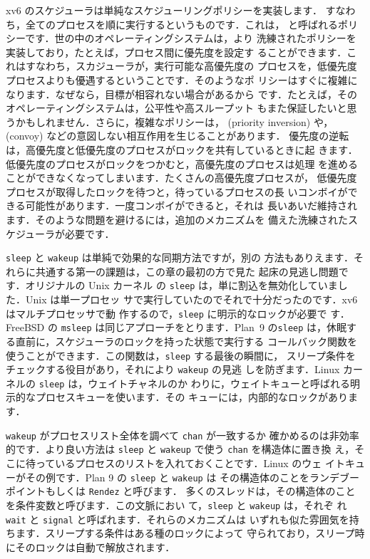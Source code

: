 xv6 のスケジューラは単純なスケジューリングポリシーを実装します．
すなわち，全てのプロセスを順に実行するというものです．これは，
と呼ばれるポリシーです．世の中のオペレーティングシステムは，より
洗練されたポリシーを実装しており，たとえば，プロセス間に優先度を設定す
ることができます．これはすなわち，スカジューラが，実行可能な高優先度の
プロセスを，低優先度プロセスよりも優遇するということです．そのようなポ
リシーはすぐに複雑になります．なぜなら，目標が相容れない場合があるから
です．たとえば，そのオペレーティングシステムは，公平性や高スループット
もまた保証したいと思うかもしれません．さらに，複雑なポリシーは，
 (priority inversion) や， (convoy) などの意図しない相互作用を生じることがあります．
優先度の逆転は，高優先度と低優先度のプロセスがロックを共有しているときに起
きます．低優先度のプロセスがロックをつかむと，高優先度のプロセスは処理
を進めることができなくなってしまいます．たくさんの高優先度プロセスが，
低優先度プロセスが取得したロックを待つと，待っているプロセスの長
いコンボイができる可能性があります．一度コンボイができると，それは
長いあいだ維持されます．そのような問題を避けるには，追加のメカニズムを
備えた洗練されたスケジューラが必要です．

\texttt{sleep} と \texttt{wakeup} は単純で効果的な同期方法ですが，別の
方法もありえます．それらに共通する第一の課題は，この章の最初の方で見た
起床の見逃し問題です．オリジナルの Unix カーネル
の \texttt{sleep} は，単に割込を無効化していました．Unix は単一プロセッ
サで実行していたのでそれで十分だったのです．xv6 はマルチプロセッサで動
作するので，\texttt{sleep} に明示的なロックが必要で
す．FreeBSD の \texttt{msleep} は同じアプローチをとります．Plan~9
の\texttt{sleep} は，休眠する直前に，スケジューラのロックを持った状態で実行する
コールバック関数を使うことができます．この関数は，\texttt{sleep} する最後の瞬間に，
スリープ条件をチェックする役目があり，それにより \texttt{wakeup} の見逃
しを防ぎます．Linux カーネルの \texttt{sleep} は，ウェイトチャネルのか
わりに，ウェイトキューと呼ばれる明示的なプロセスキューを使います．その
キューには，内部的なロックがあります．

\texttt{wakeup} がプロセスリスト全体を調べて \texttt{chan} が一致するか
確かめるのは非効率的です．より良い方法は
\texttt{sleep} と \texttt{wakeup} で使う \texttt{chan} を構造体に置き換
え，そこに待っているプロセスのリストを入れておくことです．Linux のウェ
イトキューがその例です．Plan 9 の \texttt{sleep} と \texttt{wakeup} は
その構造体のことをランデブーポイントもしくは \texttt{Rendez} と呼びます．
多くのスレッドは，その構造体のことを条件変数と呼びます．この文脈におい
て，\texttt{sleep} と \texttt{wakeup} は，それぞ
れ \texttt{wait} と \texttt{signal} と呼ばれます．それらのメカニズムは
いずれも似た雰囲気を持ちます．スリープする条件はある種のロックによって
守られており，スリープ時にそのロックは自動で解放されます．

